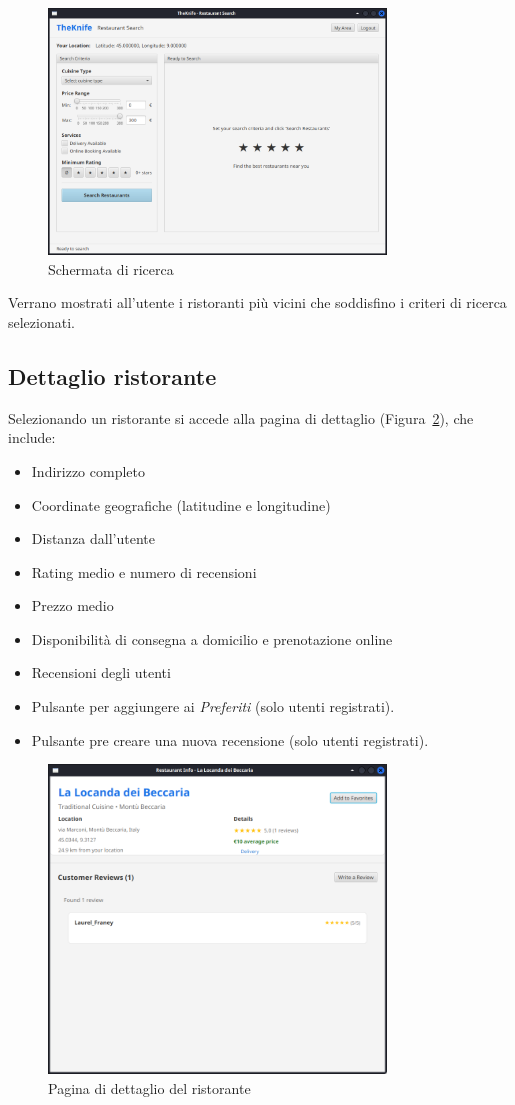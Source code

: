 \begin{figure}[H]
    \centering
    \includegraphics[width=0.8\textwidth]{images/search.png}
    \caption{Schermata di ricerca}
    \label{fig:search}
\end{figure}
Verrano mostrati all'utente i ristoranti più vicini che soddisfino i criteri di ricerca selezionati.

\subsection{Dettaglio ristorante}
Selezionando un ristorante si accede alla pagina di dettaglio (Figura~\ref{fig:restaurant}), che include:
\begin{itemize}
    \item Indirizzo completo
    \item Coordinate geografiche (latitudine e longitudine)
    \item Distanza dall'utente
    \item Rating medio e numero di recensioni
    \item Prezzo medio
    \item Disponibilità di consegna a domicilio e prenotazione online
    \item Recensioni degli utenti
    \item Pulsante per aggiungere ai \emph{Preferiti} (solo utenti registrati).
    \item Pulsante pre creare una nuova recensione (solo utenti registrati).
\end{itemize}

\begin{figure}[H]
    \centering
    \includegraphics[width=0.8\textwidth]{images/restaurant.png}
    \caption{Pagina di dettaglio del ristorante}
    \label{fig:restaurant}
\end{figure}
